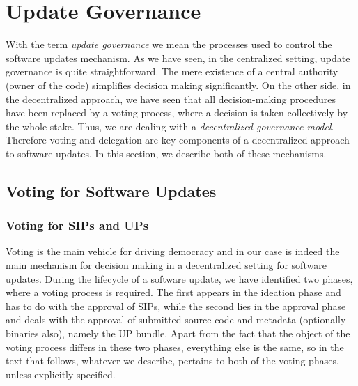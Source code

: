 \section{Update Governance}


With the term \emph{update governance} we mean the processes used to control the software updates mechanism. As we have seen, in the centralized setting, update governance is quite straightforward. The mere existence of a central authority (owner of the code) simplifies decision making significantly. On the other side, in the decentralized approach, we have seen that all decision-making procedures have been replaced by a voting process, where a decision is taken collectively by the whole stake. Thus, we are dealing with a \emph{decentralized governance model}. Therefore voting and delegation are key components of a decentralized approach to software updates.
In this section, we describe both of these mechanisms.


\subsection{Voting for Software Updates}

\subsubsection{Voting for SIPs and UPs}
Voting is the main vehicle for driving democracy and in our case is indeed the main mechanism for decision making in a decentralized setting for software updates. During the lifecycle of a software update, we have identified two phases, where a voting process is required. The first appears in the ideation phase and has to do with the approval of SIPs, while the second lies in the approval phase and deals with the approval of submitted source code and metadata (optionally binaries also), namely the UP bundle. Apart from the fact that the object of the voting process differs in these two phases, everything else is the same, so in the text that follows, whatever we describe, pertains to both of the voting phases, unless explicitly specified.

